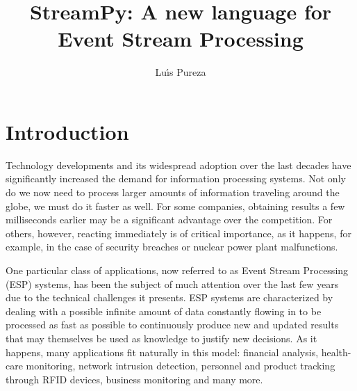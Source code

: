 \documentclass{report}
\begin{document}
\title{StreamPy: A new language for Event Stream Processing}
\author{Lu\'{\i}s Pureza}

\maketitle

\tableofcontents

\addtolength{\parskip}{\baselineskip}
\chapter{Introduction}

Technology developments and its widespread adoption over the last decades have significantly increased the demand for information processing systems. Not only do we now need to process larger amounts of information traveling around the globe, we must do it faster as well. For some companies, obtaining results a few milliseconds earlier may be a significant advantage over the competition. For others, however, reacting immediately is of critical importance, as it happens, for example, in the case of security breaches or nuclear power plant malfunctions.

One particular class of applications, now referred to as Event Stream Processing (ESP) systems, has been the subject of much attention over the last few years due to the technical challenges it presents. ESP systems are characterized by dealing with a possible infinite amount of data constantly flowing in to be processed as fast as possible to continuously produce new and updated results that may themselves be used as knowledge to justify new decisions. As it happens, many applications fit naturally in this model: financial analysis, health-care monitoring, network intrusion detection, personnel and product tracking through RFID devices, business monitoring and many more.
\end{document}
